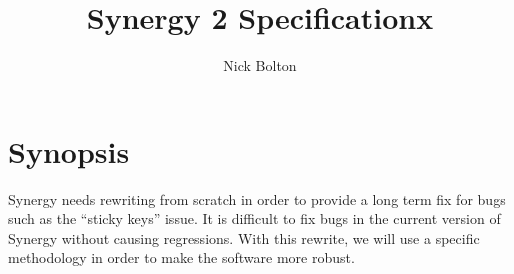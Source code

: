 \documentclass{article}
\title{Synergy 2 Specificationx}
\author{Nick Bolton}
\begin{document}
\maketitle
\clearpage

\section*{Synopsis}

Synergy needs rewriting from scratch in order to provide a long term fix for 
bugs such as the ``sticky keys'' issue. It is difficult to fix bugs in the
current version of Synergy without causing regressions. With this rewrite, we
will use a specific methodology in order to make the software more robust.

\clearpage

\setcounter{tocdepth}{2}
\tableofcontents
\clearpage


\clearpage


\clearpage


\clearpage


\clearpage

\appendix

\end{document}
